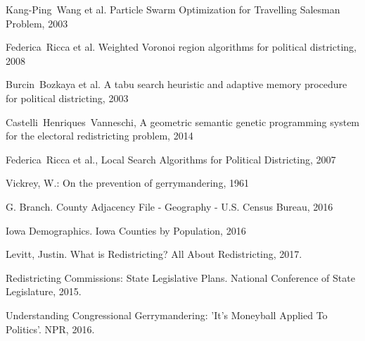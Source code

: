\documentclass[journal]{IEEEtran}
\begin{document}
\begin{thebibliography}{1}

    Kang-Ping~Wang et al. Particle Swarm Optimization for Travelling Salesman
        Problem, 2003

    Federica~Ricca et al. Weighted Voronoi region algorithms for political
        districting, 2008

    Burcin~Bozkaya et al.  A tabu search heuristic and adaptive memory procedure
        for political districting, 2003

    Castelli~Henriques~Vanneschi, A geometric semantic genetic programming system for the electoral redistricting problem, 2014

    Federica~Ricca et al., Local Search Algorithms for Political Districting, 2007

    Vickrey, W.: On the prevention of gerrymandering, 1961

    G. Branch. County Adjacency File - Geography - U.S. Census Bureau, 2016

    Iowa Demographics. Iowa Counties by Population, 2016

    Levitt, Justin. What is Redistricting? All About Redistricting, 2017.

    Redistricting Commissions: State Legislative Plans. National Conference of State Legislature, 2015.

    Understanding Congressional Gerrymandering: 'It's Moneyball Applied To Politics'. NPR, 2016.

\end{thebibliography}
\end{document}
